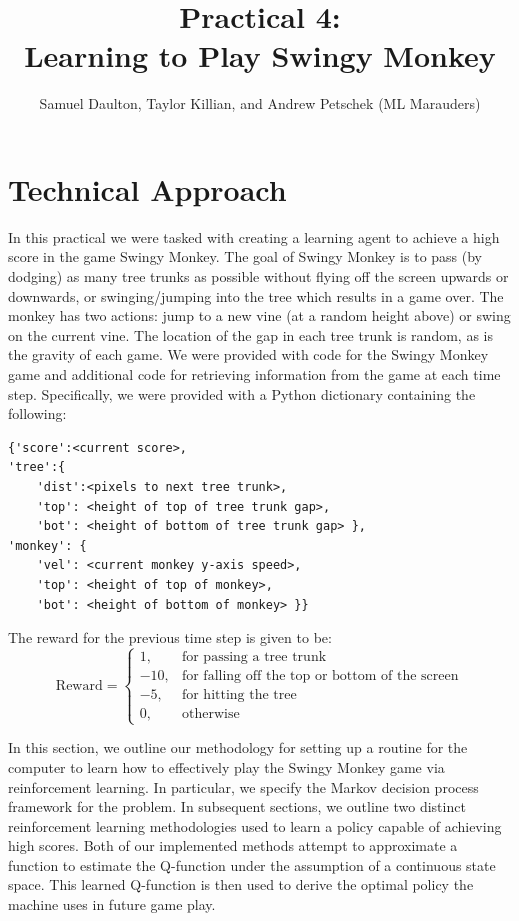 \documentclass[11pt, oneside]{article}   	%
\title{Practical 4:\\
 Learning to Play Swingy Monkey}
\author{Samuel Daulton, Taylor Killian, and Andrew Petschek (ML Marauders)}
\begin{document}
\maketitle
\section{Technical Approach}
In this practical we were tasked with creating a learning agent to achieve a high score in the game Swingy Monkey. The goal of Swingy Monkey is to pass (by dodging) as many tree trunks as possible without flying off the screen upwards or downwards, or swinging/jumping into the tree which results in a game over.  The monkey has two actions: jump to a new vine (at a random height above) or swing on the current vine. The location of the gap in each tree trunk is random, as is the gravity of each game.  We were provided with code for the Swingy Monkey game and additional code for retrieving information from the game at each time step.  Specifically, we were provided with a Python dictionary containing the following:
\begin{verbatim}
{'score':<current score>,
'tree':{
    'dist':<pixels to next tree trunk>,
    'top': <height of top of tree trunk gap>,
    'bot': <height of bottom of tree trunk gap> },
'monkey': {
    'vel': <current monkey y-axis speed>,
    'top': <height of top of monkey>,
    'bot': <height of bottom of monkey> }}
\end{verbatim}
The reward for the previous time step is given to be:
$$
\text{Reward} =
\begin{cases}
1, & \text{for passing a tree trunk} \\
-10, & \text{for falling off the top or bottom of the screen}\\
-5, & \text{for hitting the tree}\\
0, & \text{otherwise}
\end{cases}
$$

In this section, we outline our methodology for setting up a routine for the computer to learn how to effectively play the Swingy Monkey game via reinforcement learning.  In particular, we specify the Markov decision process framework for the problem.  In subsequent sections, we outline two distinct reinforcement learning methodologies used to learn a policy capable of achieving high scores.  Both of our implemented methods attempt to approximate a function to estimate the Q-function under the assumption of a continuous state space. This learned Q-function is then used to derive the optimal policy the machine uses in future game play.
\end{document}
